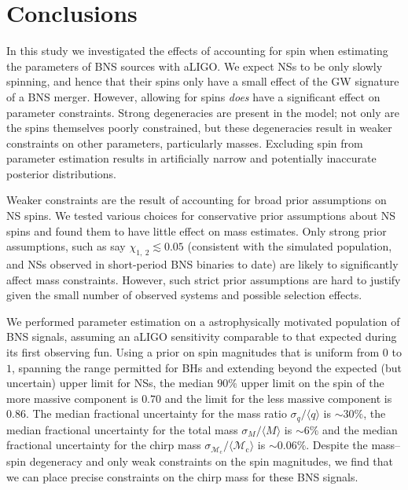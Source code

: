 \section{Conclusions}\label{sec:conclusions}

In this study we investigated the effects of accounting for spin when estimating the parameters of BNS sources with aLIGO. We expect NSs to be only slowly spinning, and hence that their spins only have a small effect of the GW signature of a BNS merger. However, allowing for spins \textit{does} have a significant effect on parameter constraints. Strong degeneracies are present in the model; not only are the spins themselves poorly constrained, but these degeneracies result in weaker constraints on other parameters, particularly masses.  Excluding spin from parameter estimation results in artificially narrow and potentially inaccurate posterior distributions.

Weaker constraints are the result of accounting for broad prior assumptions on NS spins.  We tested various choices for conservative prior assumptions about NS spins and found them to have little effect on mass estimates.  Only strong prior assumptions, such as say $\chi_{1,~2}\lesssim 0.05$ (consistent with the simulated population, and NSs observed in short-period BNS binaries to date) are likely to significantly affect mass constraints.  However, such strict prior assumptions are hard to justify given the small number of observed systems and possible selection effects.

We performed parameter estimation on a astrophysically motivated population of BNS signals, assuming an aLIGO sensitivity comparable to that expected during its first observing fun. Using a prior on spin magnitudes that is uniform from $0$ to $1$, spanning the range permitted for BHs and extending beyond the expected (but uncertain) upper limit for NSs, the median $90\%$ upper limit on the spin of the more massive component is $0.70$ and the limit for the less massive component is $0.86$. The median fractional uncertainty for the mass ratio $\sigma_q/\langle q \rangle$ is $\sim30\%$, the median fractional uncertainty for the total mass $\sigma_{{M}}/\langle {M} \rangle$ is $\sim6\%$ and the median fractional uncertainty for the chirp mass $\sigma_{\mathcal{M}_\mathrm{c}}/\langle {\mathcal{M}_\mathrm{c}} \rangle$ is $\sim0.06\%$. Despite the mass--spin degeneracy and only weak constraints on the spin magnitudes, we find that we can place precise constraints on the chirp mass for these BNS signals.

